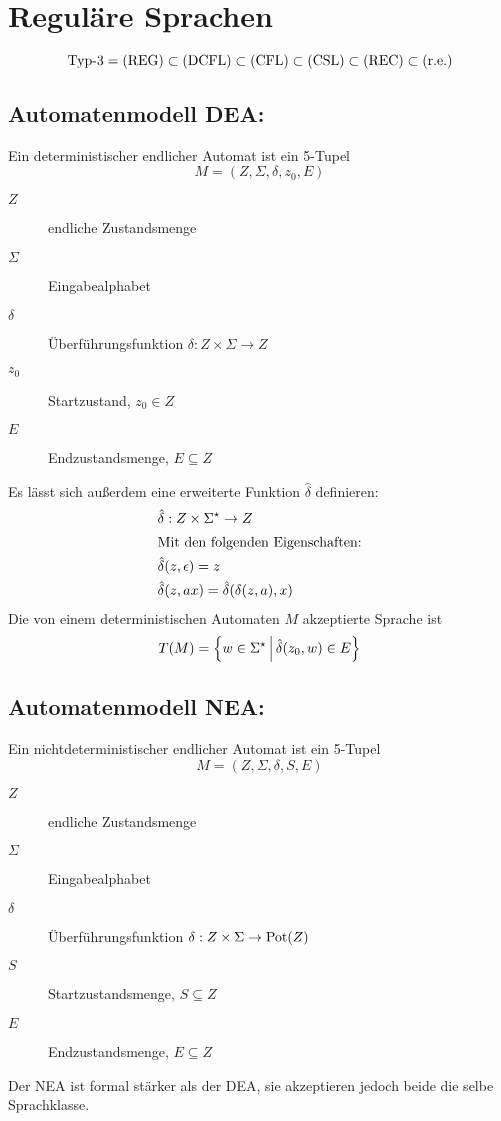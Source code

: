 \chapter{Reguläre Sprachen}
\begin{equation*}
	\text{Typ-3} = \mathrm{(REG)}\subset\mathrm{(DCFL)}\subset\mathrm{(CFL)}\subset\mathrm{(CSL)}\subset\mathrm{(REC)}\subset\mathrm{(r.e.)}
\end{equation*}

\section{Automatenmodell DEA:}
Ein deterministischer endlicher Automat ist ein 5-Tupel
\begin{equation*}
	M=(Z,\Sigma,\delta,z_0,E)
\end{equation*}
\begin{description}
	\item[$Z$] endliche Zustandsmenge
	\item[$\Sigma$] Eingabealphabet
	\item[$\delta$] Überführungsfunktion $\delta:Z\times\Sigma\rightarrow Z$
	\item[$z_0$] Startzustand, $z_0\in Z$
	\item[$E$] Endzustandsmenge, $E\subseteq Z$
\end{description}
\bigskip
Es lässt sich außerdem eine erweiterte Funktion $\hat\delta$ definieren:
\begin{align*}
	&\hat\delta:Z\times\Sigma^\star\rightarrow Z\\
	\intertext{Mit den folgenden Eigenschaften:}
	&\hat\delta(z,\epsilon)=z\\
	&\hat\delta(z,ax)=\hat\delta(\delta(z,a),x)
\end{align*}
Die von einem deterministischen Automaten $M$ akzeptierte Sprache ist
\begin{equation*}
	T(M)=\left\{ w\in\Sigma^\star \,\middle|\, \hat\delta(z_0,w)\in E \right\}
\end{equation*}

\section{Automatenmodell NEA:}\label{reg:nea}
Ein nichtdeterministischer endlicher Automat ist ein 5-Tupel
\begin{equation*}
	M=(Z,\Sigma,\delta,S,E)
\end{equation*}
\begin{description}
	\item[$Z$] endliche Zustandsmenge
	\item[$\Sigma$] Eingabealphabet
	\item[$\delta$] Überführungsfunktion $\delta:Z\times\Sigma\rightarrow \mathrm{Pot}(Z)$
	\item[$S$] Startzustandsmenge, $S\subseteq Z$
	\item[$E$] Endzustandsmenge, $E\subseteq Z$
\end{description}
Der NEA ist formal stärker als der DEA, sie akzeptieren jedoch beide die selbe Sprachklasse.

